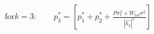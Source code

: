 \documentclass[preview]{standalone}
\begin{document}
\begin{align*}
\text{for} k=3: \qquad p_3^\ast = \left[p_1^\ast + p_2^\ast + \frac{P \sigma_\epsilon^2 + W_{tot} \sigma^2}{\left|\hat{h_3}\right|^2}\right]
\end{align*}
\end{document}
